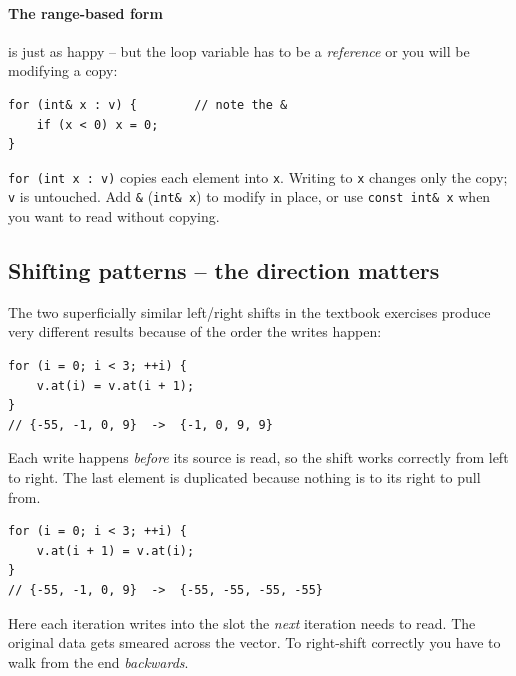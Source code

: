 \documentclass[11pt]{article}
\begin{document}
\paragraph{The range-based form} is just as happy -- but the loop
variable has to be a \emph{reference} or you will be modifying a copy:

\begin{lstlisting}
for (int& x : v) {        // note the &
    if (x < 0) x = 0;
}
\end{lstlisting}

\begin{warnbox}
\texttt{for (int x : v)} copies each element into \texttt{x}. Writing
to \texttt{x} changes only the copy; \texttt{v} is untouched. Add
\texttt{\&} (\texttt{int\& x}) to modify in place, or use
\texttt{const int\& x} when you want to read without copying.
\end{warnbox}

\subsection{Shifting patterns -- the direction matters}

The two superficially similar left/right shifts in the textbook
exercises produce very different results because of the order the writes
happen:

\begin{examplebox}
\begin{lstlisting}
for (i = 0; i < 3; ++i) {
    v.at(i) = v.at(i + 1);
}
// {-55, -1, 0, 9}  ->  {-1, 0, 9, 9}
\end{lstlisting}
Each write happens \emph{before} its source is read, so the shift
works correctly from left to right. The last element is duplicated
because nothing is to its right to pull from.
\end{examplebox}

\begin{examplebox}
\begin{lstlisting}
for (i = 0; i < 3; ++i) {
    v.at(i + 1) = v.at(i);
}
// {-55, -1, 0, 9}  ->  {-55, -55, -55, -55}
\end{lstlisting}
Here each iteration writes into the slot the \emph{next} iteration
needs to read. The original data gets smeared across the vector. To
right-shift correctly you have to walk from the end \emph{backwards}.
\end{examplebox}
\end{document}
